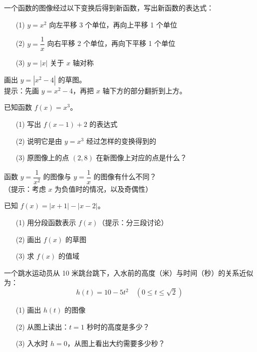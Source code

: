 \begin{exercise}[3]
一个函数的图像经过以下变换后得到新函数，写出新函数的表达式：
\begin{enumerate}
  \item[(1)] \(y = x^2\) 向左平移 3 个单位，再向上平移 1 个单位
  \item[(2)] \(y = \dfrac{1}{x}\) 向右平移 2 个单位，再向下平移 1 个单位
  \item[(3)] \(y = |x|\) 关于 \(x\) 轴对称
\end{enumerate}
\end{exercise}


\begin{exercise}[4]
画出 \(y = |x^2 - 4|\) 的草图。\\
提示：先画 \(y = x^2 - 4\)，再把 \(x\) 轴下方的部分翻折到上方。
\end{exercise}

\begin{exercise}[4]
已知函数 \(f(x) = x^3\)。
\begin{enumerate}
  \item[(1)] 写出 \(f(x - 1) + 2\) 的表达式
  \item[(2)] 说明它是由 \(y = x^3\) 经过怎样的变换得到的
  \item[(3)] 原图像上的点 \((2, 8)\) 在新图像上对应的点是什么？
\end{enumerate}
\end{exercise}

\begin{exercise}[4]
函数 \(y = \dfrac{1}{x^2}\) 的图像与 \(y = \dfrac{1}{x}\) 的图像有什么不同？\\
（提示：考虑 \(x\) 为负值时的情况，以及奇偶性）
\end{exercise}

\begin{exercise}[4]
已知 \(f(x) = |x + 1| - |x - 2|\)。
\begin{enumerate}
  \item[(1)] 用分段函数表示 \(f(x)\)（提示：分三段讨论）
  \item[(2)] 画出 \(f(x)\) 的草图
  \item[(3)] 求 \(f(x)\) 的值域
\end{enumerate}
\end{exercise}

\begin{exercise}[4]
一个跳水运动员从 10 米跳台跳下，入水前的高度（米）与时间（秒）的关系近似为：
\[
h(t) = 10 - 5t^2 \quad (0 \le t \le \sqrt{2})
\]
\begin{enumerate}
  \item[(1)] 画出 \(h(t)\) 的图像
  \item[(2)] 从图上读出：\(t = 1\) 秒时的高度是多少？
  \item[(3)] 入水时 \(h = 0\)，从图上看出大约需要多少秒？
\end{enumerate}
\end{exercise}

